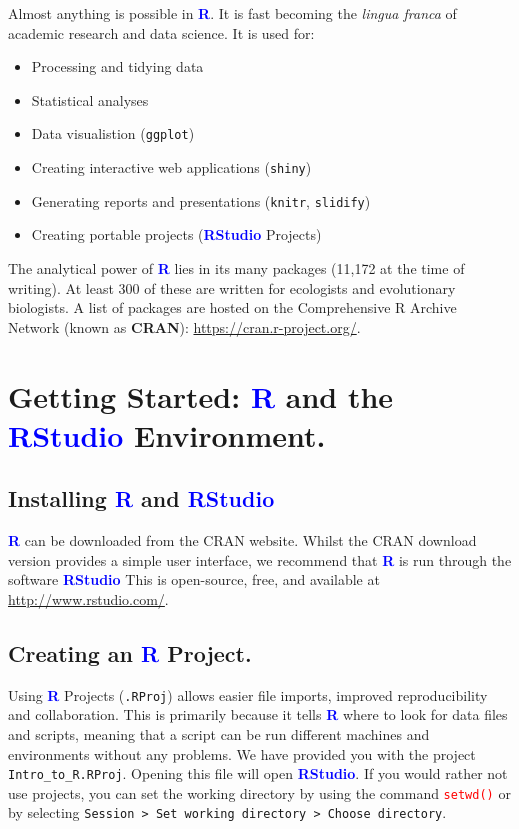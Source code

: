 \documentclass[a4paper,12pt]{article}
\newcommand\boldblue[1]{\textcolor{blue}{\textbf{#1}}}
\newcommand\code[1]{\textcolor{red}{\texttt{#1}}}
\begin{document}
Almost anything is possible in \boldblue{R}. It is fast becoming the \textit{lingua franca} of academic research and data science. It is used for:

\begin{itemize}
\item Processing and tidying data 
\item Statistical analyses
\item Data visualistion (\texttt{ggplot})
\item Creating interactive web applications (\texttt{shiny})
\item Generating reports and presentations (\texttt{knitr}, \texttt{slidify})
\item Creating portable projects (\boldblue{RStudio} Projects)
\end{itemize}

The analytical power of \boldblue{R} lies in its many packages (11,172 at the time of writing). At least 300 of these are written for ecologists and evolutionary biologists. A list of packages are hosted on the Comprehensive R Archive Network (known as \textbf{CRAN}): \url{https://cran.r-project.org/}.


\section {Getting Started: \boldblue{R} and the \boldblue{RStudio} Environment.}
\subsection {Installing \boldblue{R} and \boldblue{RStudio}}

\boldblue{R} can be downloaded from the CRAN website. Whilst the CRAN download version provides a simple user interface, we recommend that \boldblue{R} is run through the software \boldblue{RStudio} This is open-source, free, and available at \url{http://www.rstudio.com/}.


\subsection {Creating an \boldblue{R} Project.}

Using \boldblue{R} Projects (\texttt{.RProj}) allows easier file imports, improved reproducibility and collaboration. This is primarily because it tells \boldblue{R} where to look for data files and scripts, meaning that a script can be run different machines and environments without any problems. We have provided you with the project \texttt{Intro\_to\_R.RProj}. Opening this file will open \boldblue{RStudio}. If you would rather not use projects, you can set the working directory by using the command \code{setwd()} or by selecting \texttt{Session > Set working directory > Choose directory}. \\
\end{document}
